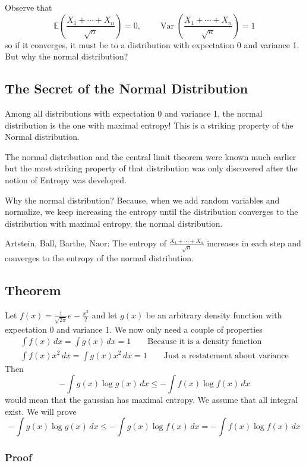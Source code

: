 \documentclass{article}
\begin{document}
Observe that 
\[
\mathbb{E}\left(\frac{X_1 + \cdots + X_n}{\sqrt{n}}\right)=0, \qquad \operatorname{Var}\left(\frac{X_1 + \cdots + X_n}{\sqrt{n}}\right)=1
\]
so if it converges, it must be to a distribution with expectation 0 and variance 1. But why the normal distribution?

\subsection{The Secret of the Normal Distribution}

Among all distributions with expectation 0 and variance 1, the normal distribution is the one with maximal entropy! This is a striking property of the Normal distribution.

The normal distribution and the central limit theorem were known much earlier but the most striking property of that distribution was only discovered after the notion of Entropy was developed.

Why the normal distribution? Because, when we add random variables and normalize, we keep increasing the entropy until the distribution converges to the distribution with maximal entropy, the normal distribution.

Artstein, Ball, Barthe, Naor: The entropy of $\frac{X_1 + \cdots + X_n}{\sqrt{n}}$ increases in each step and converges to the entropy of the normal distribution.

\subsection{Theorem}

Let $f(x)=\frac{1}{\sqrt{2\pi}}e^{}-\frac{x^2}{2}$ and let $g(x)$ be an arbitrary density function with expectation 0 and variance 1. We now only need a couple of properties
\begin{gather*}
    \int f(x) \, dx = \int g(x) \, dx = 1\qquad\text{Because it is a density function}\\
    \int f(x)x^2 \, dx = \int g(x)x^2\, dx =1 \qquad\text{Just a restatement about variance}
\end{gather*}
Then 
\[
-\int g(x)\log g(x)\, dx \leq -\int f(x)\log f(x)\, dx
\]
would mean that the gaussian has maximal entropy. We assume that all integral exist. We will prove 
\[
-\int g(x)\log g(x)\, dx \leq -\int g(x)\log f(x)\,dx = -\int f(x)\log f(x)\, dx
\]

\subsubsection{Proof}
\end{document}
